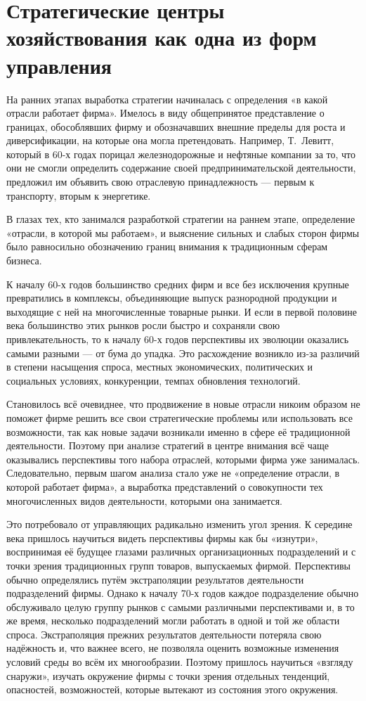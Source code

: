 \section{Стратегические центры хозяйствования как одна из форм управления}

На ранних этапах выработка стратегии начиналась с определения «в какой отрасли работает фирма».
Имелось в виду общепринятое представление о границах, обособлявших фирму и обозначавших внешние пределы для роста и диверсификации, на которые она могла претендовать. Например, Т. Левитт, который в 60-х годах порицал железнодорожные и нефтяные компании за то, что они не смогли определить содержание своей предпринимательской деятельности, предложил им объявить свою отраслевую принадлежность — первым к транспорту, вторым к энергетике.

В глазах тех, кто занимался разработкой стратегии на раннем этапе, определение «отрасли, в которой мы работаем», и выяснение сильных и слабых сторон фирмы было равносильно обозначению границ внимания к традиционным сферам бизнеса.

К началу 60-х годов большинство средних фирм и все без исключения крупные превратились в комплексы, объединяющие выпуск разнородной продукции и выходящие с ней на многочисленные товарные рынки. И если в первой половине века большинство этих рынков росли быстро и сохраняли свою привлекательность, то к началу 60-х годов перспективы их эволюции оказались самыми разными — от бума до упадка. Это расхождение возникло из-за различий в степени насыщения спроса, местных экономических, политических и социальных условиях, конкуренции, темпах обновления технологий.

Становилось всё очевиднее, что продвижение в новые отрасли никоим образом не поможет фирме решить все свои стратегические проблемы или использовать все возможности, так как новые задачи возникали именно в сфере её традиционной деятельности. Поэтому при анализе стратегий в центре внимания всё чаще оказывались перспективы того набора отраслей, которыми фирма уже занималась. Следовательно, первым шагом анализа стало уже не «определение отрасли, в которой работает фирма», а выработка представлений о совокупности тех многочисленных видов деятельности, которыми она занимается.

Это потребовало от управляющих радикально изменить угол зрения. К середине века пришлось научиться видеть перспективы фирмы как бы «изнутри», воспринимая её будущее глазами различных организационных подразделений и с точки зрения традиционных групп товаров, выпускаемых фирмой. Перспективы обычно определялись путём экстраполяции результатов деятельности подразделений фирмы. Однако к началу 70-х годов каждое подразделение обычно обслуживало целую группу рынков с самыми различными перспективами и, в то же время, несколько подразделений могли работать в одной и той же области спроса. Экстраполяция прежних результатов деятельности потеряла свою надёжность и, что важнее всего, не позволяла оценить возможные изменения условий среды во всём их многообразии. Поэтому пришлось научиться «взгляду снаружи», изучать окружение фирмы с точки зрения отдельных тенденций, опасностей, возможностей, которые вытекают из состояния этого окружения.

